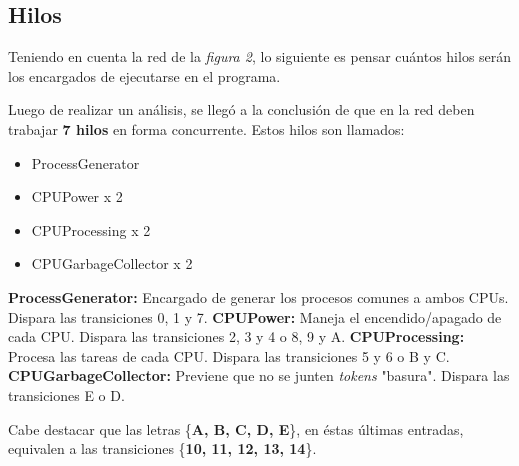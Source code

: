 \documentclass{article}
\begin{document}
    \subsection{Hilos}
    Teniendo en cuenta la red de la \emph{figura 2}, lo siguiente es pensar cuántos hilos
    serán los encargados de ejecutarse en el programa. \par
    Luego de realizar un análisis, se llegó a la conclusión de que en la red deben trabajar
    \textbf{7 hilos} en forma concurrente. Estos hilos son llamados:
    \begin{itemize}
        \item ProcessGenerator
        \item CPUPower x 2
        \item CPUProcessing x 2
        \item CPUGarbageCollector x 2
    \end{itemize}
    \textbf{ProcessGenerator:} Encargado de generar los procesos comunes a ambos CPUs.
    Dispara las transiciones 0, 1 y 7. \newline \newline
    \textbf{CPUPower:} Maneja el encendido/apagado de cada CPU. Dispara las transiciones
    2, 3 y 4 o 8, 9 y A. \newline \newline
    \textbf{CPUProcessing:} Procesa las tareas de cada CPU. Dispara las transiciones
    5 y 6 o B y C. \newline \newline
    \textbf{CPUGarbageCollector:} Previene que no se junten \emph{tokens} "basura". 
    Dispara las transiciones E o D.\newline \par
    Cabe destacar que las letras \{\textbf{A, B, C, D, E}\}, en éstas últimas entradas, 
    equivalen a las transiciones \{\textbf{10, 11, 12, 13, 14}\}. 
\end{document}
